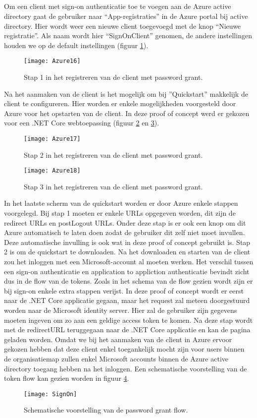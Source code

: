 \subsection{}
Om een client met sign-on authenticatie toe te voegen aan de Azure active directory gaat de gebruiker naar “App-registraties” in de Azure portal bij active directory. Hier wordt weer een nieuwe client toegevoegd met de knop “Nieuwe registratie”. Als naam wordt hier “SignOnClient” genomen, de andere instellingen houden we op de default instellingen (figuur \ref{fig:azure16}). 
\begin{figure}[H]
	\centering
	\texttt{[image: Azure16]} 
	\caption[Azure16]{Stap 1 in het registreren van de client met password grant.}
	\label{fig:azure16}
\end{figure}
Na het aanmaken van de client is het mogelijk om bij ”Quickstart” makkelijk de client te configureren. Hier worden er enkele mogelijkheden voorgesteld door Azure voor het opstarten van de client. In deze proof of concept werd er gekozen voor een .NET Core webtoepassing (figuur \ref{fig:azure17} en \ref{fig:azure18}).
\begin{figure}[H]
	\centering
	\texttt{[image: Azure17]} 
	\caption[Azure17]{Stap 2 in het registreren van de client met password grant.}
	\label{fig:azure17}
\end{figure}\newpage
\begin{figure}[H]
	\centering
	\texttt{[image: Azure18]} 
	\caption[Azure18]{Stap 3 in het registreren van de client met password grant.}
	\label{fig:azure18}
\end{figure}
In het laatste scherm van de quickstart worden er door Azure enkele stappen voorgelegd. Bij stap 1 moeten er enkele URLs opgegeven worden, dit zijn de redirect URLs en postLogout URLs. Onder deze stap is er ook een knop om dit Azure automatisch te laten doen zodat de gebruiker dit zelf niet moet invullen. Deze automatische invulling is ook wat in deze proof of concept gebruikt is. Stap 2 is om de quickstart te downloaden. Na het downloaden en starten van de client zou het inloggen met een Microsoft-account al moeten werken.\newline
Het verschil tussen een sign-on authenticatie en application to appliction authenticatie bevindt zicht dus in de flow van de tokens. Zoals in het schema van de flow gezien wordt zijn er bij sign-on enkele extra stappen verijst. In deze proof of concept wordt er eerst naar de .NET Core applicatie gegaan, maar het request zal meteen doorgestuurd worden naar de Microsoft identity server. Hier zal de gebruiker zijn gegevens moeten ingeven om zo aan een geldige access token te komen. Na deze stap wordt met de redirectURL teruggegaan naar de .NET Core applicatie en kan de pagina geladen worden. Omdat we bij het aanmaken van de client in Azure ervoor gekozen hebben dat deze client enkel toegankelijk mocht zijn voor users binnen de organisatiemap zullen enkel Microsoft accounts binnen de Azure active directory toegang hebben na het inloggen. Een schematische voorstelling van de token flow kan gezien worden in figuur \ref{fig:signOn}. 
\begin{figure}[H]
	\centering
	\texttt{[image: SignOn]} 
	\caption[SignOn]{Schematische voorstelling van de password grant flow.}
	\label{fig:signOn}
\end{figure}